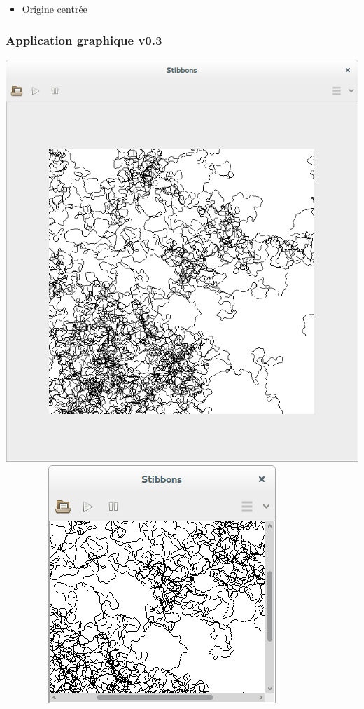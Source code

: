 \begin{frame}
\begin{itemize}
	\item Origine centrée
\end{itemize}
\end{frame}

\begin{frame}
\frametitle{Application graphique v0.3}
\begin{center}
\includegraphics[scale=0.16]{doc/report/screenshot/stibbons-0-3-2.png}
~~~~~~~~
\includegraphics[scale=0.16]{doc/report/screenshot/stibbons-0-3-3.png}
\end{center}


\end{frame}
